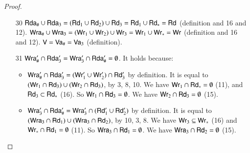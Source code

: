 \begin{proof}
\begin{itemize}
\begin{itemize}
  \item[30]
$\mathsf {Rda}_\# \cup \mathsf {Rda}_3 = (\mathsf{Rd}_1 \cup \mathsf{Rd}_2) \cup \mathsf{Rd}_3 = \mathsf{Rd}_1 \cup \mathsf{Rd}_* = \mathsf{Rd}$ (definition and 16 and 12).
    $\mathsf {Wra}_\# \cup \mathsf {Wra}_3 = (\mathsf{Wr}_1 \cup \mathsf{Wr}_2) \cup \mathsf{Wr}_3 = \mathsf{Wr}_1 \cup \mathsf{Wr}_* = \mathsf{Wr}$ (definition and 16 and 12).
    $\mathsf{V} = \mathsf {Va}_\# = \mathsf {Va}_3$ (definition).
    
  \item[31] $\mathsf {Wra}'_\# \cap \mathsf {Rda}'_3 = \mathsf {Wra}'_3 \cap \mathsf {Rda}'_\# = \emptyset$. It holds because:
    \begin{itemize}
    \item $\mathsf {Wra}'_\# \cap \mathsf {Rda}'_3 = (\mathsf{Wr}'_1 \cup \mathsf{Wr}'_2) \cap \mathsf{Rd}'_3$ by definition. It is equal to $(\mathsf{Wr}_1 \cap \mathsf{Rd}_3) \cup (\mathsf{Wr}_2 \cap \mathsf{Rd}_3)$, by 3, 8, 10. We have $\mathsf{Wr}_1 \cap \mathsf{Rd}_* = \emptyset$ (11), and $\mathsf{Rd}_3 \subset \mathsf{Rd}_*$ (16). So $\mathsf{Wr}_1 \cap \mathsf{Rd}_3 = \emptyset$.
      We have $\mathsf{Wr}_2 \cap \mathsf{Rd}_3 = \emptyset$ (15).
    \item $\mathsf {Wra}'_3 \cap \mathsf {Rda}'_\# = \mathsf {Wra}'_3 \cap (\mathsf{Rd}'_1 \cup \mathsf{Rd}'_2)$ by definition. It is equal to $(\mathsf {Wra}_3 \cap \mathsf{Rd}_1) \cup (\mathsf {Wra}_3 \cap \mathsf{Rd}_2)$, by 10, 3, 8. We have $\mathsf{Wr}_3 \subseteq \mathsf{Wr}_*$ (16) and $\mathsf{Wr}_* \cap \mathsf{Rd}_1 = \emptyset$ (11).
      So $\mathsf {Wra}_3 \cap \mathsf{Rd}_1 = \emptyset$.
      We have $\mathsf {Wra}_3 \cap \mathsf{Rd}_2 = \emptyset$ (15).
    \end{itemize}


\end{itemize}
\end{itemize}
\end{proof}
